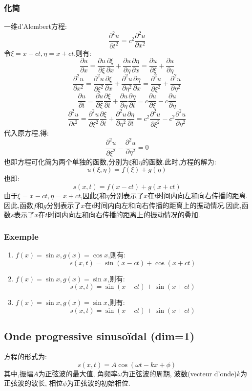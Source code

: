 \documentclass[12pt, a4paper, oneside]{ctexbook}
\newcommand{\pian }{\partial}%
\begin{document}
  \subsubsection{化简}
  一维d'Alembert方程:
  $$
    \frac{\pian^2 u}{\pian t^2}=c^2\frac{\pian^2 u}{\pian x^2}
  $$
  令$\xi=x-ct,\eta=x+ct$,则有:
  $$
    \frac{\pian u}{\pian x}=\frac{\pian u}{\pian \xi}\frac{\pian \xi}{\pian x}+\frac{\pian u}{\pian \eta}\frac{\pian \eta}{\pian x}=\frac{\pian u}{\pian \xi}+\frac{\pian u}{\pian \eta}
  $$
  $$
    \frac{\pian^2 u}{\pian x^2}=\frac{\pian^2 u}{\pian \xi^2}\frac{\pian \xi}{\pian x}+\frac{\pian^2 u}{\pian \eta^2}\frac{\pian \eta}{\pian x}=\frac{\pian^2 u}{\pian \xi^2}+\frac{\pian^2 u}{\pian \eta^2}
  $$
  $$
    \frac{\pian u}{\pian t}=\frac{\pian u}{\pian \xi}\frac{\pian \xi}{\pian t}+\frac{\pian u}{\pian \eta}\frac{\pian \eta}{\pian t}=c\frac{\pian u}{\pian \xi}-c\frac{\pian u}{\pian \eta}
  $$
  $$
    \frac{\pian^2 u}{\pian t^2}=\frac{\pian^2 u}{\pian \xi^2}\frac{\pian \xi}{\pian t}+\frac{\pian^2 u}{\pian \eta^2}\frac{\pian \eta}{\pian t}=c^2\frac{\pian^2 u}{\pian \xi^2}-c^2\frac{\pian^2 u}{\pian \eta^2}
  $$
  代入原方程,得:
  $$
    \frac{\pian^2 u}{\pian \xi^2}-\frac{\pian^2 u}{\pian \eta^2}=0
  $$
  也即方程可化简为两个单独的函数,分别为$\xi$和$\eta$的函数.此时,方程的解为:
  $$
    u(\xi,\eta)=f(\xi)+g(\eta)
  $$
  也即:
  $$
    s(x,t)=f(x-ct)+g(x+ct)
  $$
  由于$\xi=x-ct,\eta=x+ct$,因此$\xi$和$\eta$分别表示了$x$在$t$时间内向左和向右传播的距离.因此,函数$f$和$g$分别表示了$x$在$t$时间内向左和向右传播的距离上的振动情况.因此,函数$s$表示了$x$在$t$时间内向左和向右传播的距离上的振动情况的叠加.
  \subsubsection{Exemple}
  \begin{enumerate}
    \item $f(x)=\sin x,g(x)=\cos x$,则有:
    $$
      s(x,t)=\sin(x-ct)+\cos(x+ct)
    $$
    \item $f(x)=\sin x,g(x)=\sin x$,则有:
    $$
      s(x,t)=\sin(x-ct)+\sin(x+ct)
    $$
    \item $f(x)=\sin x,g(x)=\sin x$,则有:
    $$
      s(x,t)=\sin(x-ct)+\sin(x+ct)
    $$
  \end{enumerate}
  \subsection{Onde progressive sinusoïdal (dim=1) }
  方程的形式为:
  $$
  s(x,t)=A\cos(\omega t-kx+\phi)
  $$
  其中,振幅$A$为正弦波的最大值,
  角频率$\omega$为正弦波的周期,
  波数(vecteur d'onde)$k$为正弦波的波长,
  相位$\phi$为正弦波的初始相位.
\end{document}
